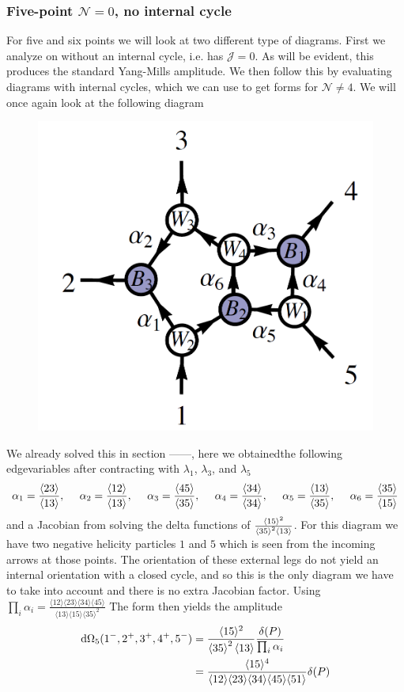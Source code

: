 \documentclass[letter,11pt]{article}
\newcommand{\ab}[1]{\langle #1 \rangle}
\begin{document}
\subsubsection{Five-point $\mathcal{N}=0$, no internal cycle}
For five and six points we will look at two different type of diagrams. First we analyze on without an internal cycle, i.e. has $\mathcal{J}=0$. As will be evident, this produces  the standard Yang-Mills amplitude. We then follow this by evaluating diagrams with internal cycles, which we can use to get forms for $\mathcal{N}\neq4$.
We will once again look at the following diagram
\begin{figure}[H]
	\centering
	\includegraphics[width=0.3\linewidth]{5pt}
	\caption{}
	\label{fig:5pt}
\end{figure}
We already solved this in section ------, here we obtainedthe following edgevariables after contracting with $\lambda_1$, $\lambda_3$, and $\lambda_5$
\begin{equation}
	\begin{aligned}
		\alpha_1=\frac{\expval{23}}{\expval{13}},~~~~
		\alpha_2=\frac{\expval{12}}{\expval{13}},~~~~
		\alpha_3=\frac{\expval{45}}{\expval{35}},~~~~
		\alpha_4=\frac{\expval{34}}{\expval{34}},~~~~
		\alpha_5=\frac{\expval{13}}{\expval{35}},~~~~
		\alpha_6=\frac{\expval{35}}{\expval{15}}
	\end{aligned}
\end{equation}
and a Jacobian from solving the delta functions of $\frac{\ab{15}^2}{\expval{35}^2\expval{13}}$. For this diagram we have two negative helicity particles $1$ and $5$ which is seen from the incoming arrows at those points. The orientation of these external legs do not yield an internal orientation with a closed cycle, and so this is the only diagram we have to take into account and there is no extra Jacobian factor. Using $\prod_{i}\alpha_i=\frac{\ab{12}\ab{23}\ab{34}\ab{45}}{\ab{13}\ab{15}\ab{35}^2}$ The form then yields the amplitude
\begin{equation}
	\begin{aligned}
		\dd \Omega_5(1^-,2^+,3^+,4^+,5^-)&=\frac{\ab{15}^2}{\expval{35}^2\expval{13}}\frac{\delta(P)}{\prod_i \alpha_i}\\
		&=\frac{\ab{15}^4}{\ab{12}\ab{23}\ab{34}\ab{45}\ab{51}}\delta(P)
	\end{aligned}
\end{equation}
\end{document}
